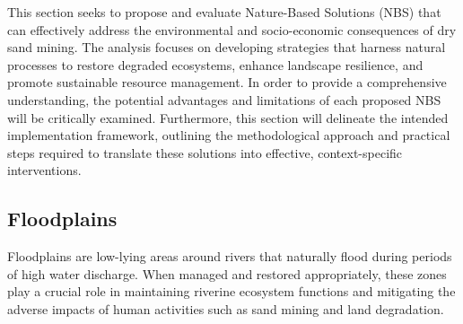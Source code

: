 

This section seeks to propose and evaluate Nature-Based Solutions (NBS) that can effectively address the environmental and socio-economic consequences of dry sand mining. The analysis focuses on developing strategies that harness natural processes to restore degraded ecosystems, enhance landscape resilience, and promote sustainable resource management. In order to provide a comprehensive understanding, the potential advantages and limitations of each proposed NBS will be critically examined. Furthermore, this section will delineate the intended implementation framework, outlining the methodological approach and practical steps required to translate these solutions into effective, context-specific interventions.

\subsection{Floodplains}

Floodplains are low-lying areas around rivers that naturally flood during periods of high water discharge. When managed and restored appropriately, these zones play a crucial role in maintaining riverine ecosystem functions and mitigating the adverse impacts of human activities such as sand mining and land degradation.

